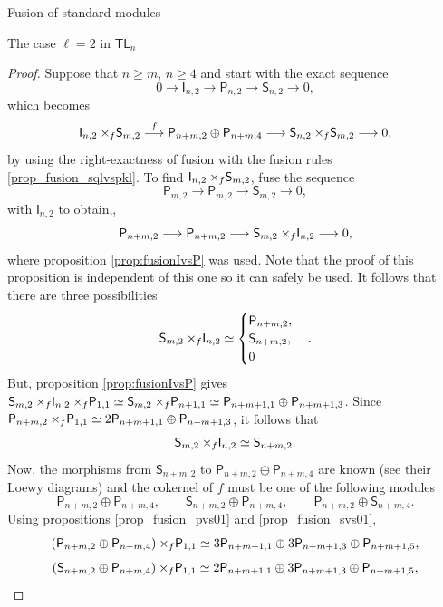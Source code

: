 \documentclass[reqno]{amsart}
\newcommand{\tl}[1]{\mathsf{TL}_{#1}}
\newcommand{\ds}[1]{\mathsf S_{#1}}
\newcommand{\dl}[1]{\mathsf I_{#1}}
\newcommand{\dP}[1]{\mathsf P_{#1}}
\newcommand{\xf}{\times\hspace{-0.27em}_f}
\newcommand{\lc}{\ell}
\begin{document}
\begin{section}{Fusion of standard modules}
\begin{subsection}{The case $\lc =2$ in $\tl{n}$}
\begin{proof}
Suppose that $n\geq m$, $n \geq 4$  and start with the exact sequence $$ 0 \longrightarrow \dl{n,2} \longrightarrow \dP{n,2} \longrightarrow \ds{n,2} \longrightarrow 0,$$ which becomes
\begin{equation}
\dl{n,2}\xf \ds{m,2} \overset{f}{\longrightarrow} \dP{n+m,2} \oplus \dP{n+m,4} \longrightarrow \ds{n,2} \xf \ds{m,2} \longrightarrow 0,
\end{equation}
by using the right-exactness of fusion with the fusion rules \ref{prop_fusion_sqlvspkl}. To find $\dl{n,2}\xf \ds{m,2}$, fuse the sequence
$$\dP{m,2} \longrightarrow \dP{m,2} \longrightarrow \ds{m,2} \longrightarrow 0, $$
with $\dl{n,2}$ to obtain,, 
\begin{equation}
\dP{n+m,2} \longrightarrow \dP{n+m,2} \longrightarrow \ds{m,2} \xf \dl{n,2} \longrightarrow 0,
\end{equation}
where proposition \ref{prop:fusionIvsP} was used. Note that the proof of this proposition is independent of this one so it can safely be used. It follows that there are three possibilities
\begin{equation*}
\ds{m,2} \xf \dl{n,2} \simeq \begin{cases}
\dP{n+m,2}, & \\
\ds{n+m,2}, & \\
0
\end{cases}.
\end{equation*}
But, proposition \ref{prop:fusionIvsP} gives $\ds{m,2}\xf \dl{n,2} \xf \dP{1,1} \simeq \ds{m,2}\xf \dP{n+1,1} \simeq \dP{n+m+1,1} \oplus \dP{n+m+1,3}$. Since $\dP{n+m,2}\xf \dP{1,1} \simeq 2\dP{n+m+1,1} \oplus \dP{n+m+1,3}$, it follows that $$\ds{m,2} \xf \dl{n,2} \simeq \ds{n+m,2}. $$
Now, the morphisms from $\ds{n+m,2}$ to $ \dP{n+m,2} \oplus \dP{n+m,4}$ are known (see their Loewy diagrams) and the cokernel of $f$ must be one of the following modules
\begin{equation*}
 \dP{n+m,2} \oplus \dP{n+m,4}, \qquad \ds{n+m,2} \oplus \dP{n+m,4}, \qquad \dP{n+m,2} \oplus \ds{n+m,4}.
\end{equation*}
Using propositions \ref{prop_fusion_pvs01} and \ref{prop_fusion_svs01},
\begin{equation*}
\left( \dP{n+m,2} \oplus \dP{n+m,4}\right)\xf \dP{1,1} \simeq 3\dP{n+m+1,1} \oplus 3\dP{n+m+1,3} \oplus \dP{n+m+1,5},
\end{equation*}
\begin{equation*}
(\ds{n+m,2} \oplus \dP{n+m,4})\xf \dP{1,1} \simeq 2\dP{n+m+1,1} \oplus 3\dP{n+m+1,3} \oplus \dP{n+m+1,5},
\end{equation*}

\end{proof}
\end{subsection}
\end{section}
\end{document}

